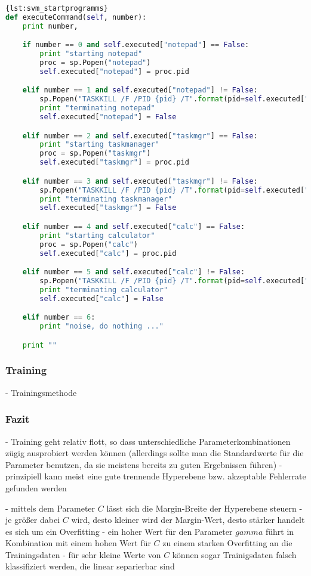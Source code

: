 \begin{lstlisting}[language=Python,caption={Start Programms},label={lst:svm_startprogramms}]{lst:svm_startprogramms}
def executeCommand(self, number):
	print number,

	if number == 0 and self.executed["notepad"] == False:
		print "starting notepad"
		proc = sp.Popen("notepad")
		self.executed["notepad"] = proc.pid

	elif number == 1 and self.executed["notepad"] != False:
		sp.Popen("TASKKILL /F /PID {pid} /T".format(pid=self.executed["notepad"]))
		print "terminating notepad"
		self.executed["notepad"] = False

	elif number == 2 and self.executed["taskmgr"] == False:
		print "starting taskmanager"
		proc = sp.Popen("taskmgr")
		self.executed["taskmgr"] = proc.pid

	elif number == 3 and self.executed["taskmgr"] != False:
		sp.Popen("TASKKILL /F /PID {pid} /T".format(pid=self.executed["taskmgr"]))
		print "terminating taskmanager"
		self.executed["taskmgr"] = False

	elif number == 4 and self.executed["calc"] == False:
		print "starting calculator"
		proc = sp.Popen("calc")
		self.executed["calc"] = proc.pid

	elif number == 5 and self.executed["calc"] != False:
		sp.Popen("TASKKILL /F /PID {pid} /T".format(pid=self.executed["calc"]))
		print "terminating calculator"
		self.executed["calc"] = False

	elif number == 6:
		print "noise, do nothing ..."

	print ""
\end{lstlisting}


\subsubsection{Training}
- Trainingsmethode

\subsubsection{Fazit}
- Training geht relativ flott, so dass unterschiedliche Parameterkombinationen zügig ausprobiert werden können (allerdings sollte man die Standardwerte für die Parameter benutzen, da sie meistens bereits zu guten Ergebnissen führen)
- prinzipiell kann meist eine gute trennende Hyperebene bzw. akzeptable Fehlerrate gefunden werden

- mittels dem Parameter $C$ lässt sich die Margin-Breite der Hyperebene steuern
- je größer dabei $C$ wird, desto kleiner wird der Margin-Wert, desto stärker handelt es sich um ein Overfitting
- ein hoher Wert für den Parameter $gamma$ führt in Kombination mit einem hohen Wert für $C$ zu einem starken Overfitting an die Trainingsdaten
- für sehr kleine Werte von $C$ können sogar Trainigsdaten falsch klassifiziert werden, die linear separierbar sind

